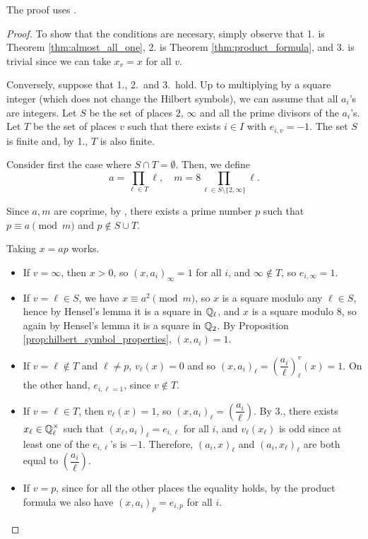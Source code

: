The proof uses .

\begin{proof}
To show that the conditions are necesary, simply observe that 1. is Theorem \ref{thm:almost_all_one},
2. is Theorem \ref{thm:product_formula}, and 3. is trivial since we can take $x_v = x$ for all $v$.

Conversely, suppose that 1., 2.\ and 3.\ hold. Up to multiplying by a square integer (which does
not change the Hilbert symbols), we can assume that all $a_i$'s are integers.
Let $S$ be the set of places $2$, $\infty$ and all the prime divisors of the $a_i$'s.
Let $T$ be the set of places $v$ such that there exists $i \in I$ with $e_{i,v}=-1$.
The set $S$ is finite and, by 1., $T$ is also finite.

Consider first the case where $S \cap T= \emptyset$. Then, we define
\[
a = \prod_{\ell \in T} \ell, \quad m = 8 \prod_{\ell \in S \setminus\{2,\infty\}} \ell.
\]

Since $a,m$ are coprime, by , there exists a prime number
$p$ such that $p \equiv a \pmod m$ and $p \not\in S \cup T$.

Taking $x=ap$ works.
\begin{itemize}
	\item If $v= \infty$, then $x > 0$, so $(x, a_i)_\infty = 1$ for all $i$, and $\infty \notin T$,
	so $e_{i,\infty}=1$.
	\item If $v = \ell \in S$, we have $x \equiv a^2 \pmod m$, so $x$ is a square modulo any $\ell \in S$,
	hence by Hensel's lemma it is a square in $\mathbb{Q}_\ell$, and $x$ is a square modulo $8$, so again by
	Hensel's lemma it is a square in $\mathbb{Q}_2$. By Proposition \ref{prop:hilbert_symbol_properties},
	$(x,a_i)=1$.
	\item If $v = \ell \notin T$ and $\ell \ne p$, $v_\ell(x)=0$ and so
	$(x,a_i)_{\ell}=\left(\dfrac{a_i}{\ell}\right)^v_{\ell}(x)=1$. On the other hand, $e_{i,\ell=1}$,
	since $v \notin T$.
	\item If $v = \ell \in T$, then $v_\ell(x)=1$, so $(x,a_i)_{\ell}=\left(\dfrac{a_i}{\ell}\right)$.
  By 3., there exists $x_\ell \in \mathbb{Q}_\ell^\times$ such that $(x_\ell, a_i)_\ell = e_{i,\ell}$ for all $i$,
	and $v_\ell(x_\ell)$ is odd since at least one of the $e_{i,\ell}$'s is $-1$.
	Therefore, $(a_i,x)_\ell$ and $(a_i,x_\ell)_\ell$ are both equal to $\left(\dfrac{a_i}{\ell}\right)$.
	\item If $v = p$, since for all the other places the equality holds, by the product formula we
	also have $(x,a_i)_p = e_{i,p}$ for all $i$.
\end{itemize}


\end{proof}
